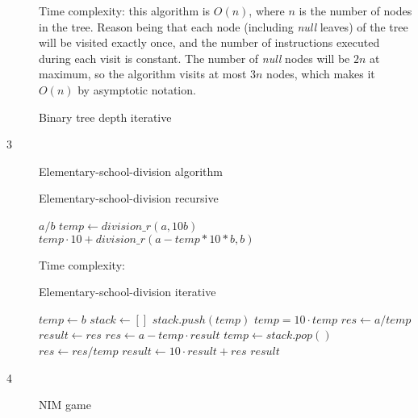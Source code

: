 \documentclass{article}
\begin{document}
\begin{description}
  Time complexity: this algorithm is $O(n)$, where $n$ is the number of nodes in the tree. Reason being that each node (including \textit{null} leaves) of the tree will be visited exactly once, and the number of instructions executed during each visit is constant. The number of \textit{null} nodes will be $2n$ at maximum, so the algorithm visits at most $3n$ nodes, which makes it $O(n)$ by asymptotic notation.

  \begin{algorithm}
  \caption{Binary tree depth iterative}
    \begin{algorithmic}[1]
      
    \EndFunction
    \end{algorithmic}
  \end{algorithm}

\item[3]{Elementary-school-division algorithm}

  \begin{algorithm}
  \caption{Elementary-school-division recursive}
    \begin{algorithmic}[1]
        \State \Return $a/b$
      \Else {} 
        \State $temp \gets division\_r(a, 10b)$
        \State \Return $temp \cdot 10 + division\_r(a - temp * 10 * b, b)$
      \EndIf
    \EndFunction
    \end{algorithmic}
  \end{algorithm}

  Time complexity: 

  \begin{algorithm}
  \caption{Elementary-school-division iterative}
    \begin{algorithmic}[1]
      \State $temp \gets b$
      \State $stack \gets []$
        \State $stack.push(temp)$
        \State $temp = 10 \cdot temp$
      \EndWhile
      \State $res \gets a / temp$
      \State $result \gets res$
        \State $res \gets a - temp \cdot result$
        \State $temp \gets stack.pop()$
        \State $res \gets res / temp$
        \State $result \gets 10 \cdot result + res$
      \EndWhile
      \State \Return $result$
    \EndFunction
    \end{algorithmic}
  \end{algorithm}

\item[4]{NIM game}


\end{description}
\end{document}
